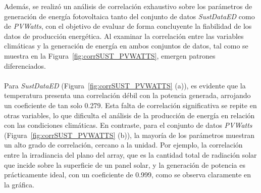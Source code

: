 Además, se realizó un análisis de correlación exhaustivo sobre los parámetros de generación de energía fotovoltaica tanto del conjunto de datos \textit{SustDataED} como de \textit{PVWatts}, con el objetivo de evaluar de forma concluyente la fiabilidad de los datos de producción energética. Al examinar la correlación entre las variables climáticas y la generación de energía en ambos conjuntos de datos, tal como se muestra en la Figura~\ref{fig:corrSUST_PVWATTS}, emergen patrones diferenciados.\\
\\
Para \textit{SustDataED} (Figura~\ref{fig:corrSUST_PVWATTS} (a)), es evidente que la temperatura presenta una correlación débil con la potencia generada, arrojando un coeficiente de tan solo 0.279. Esta falta de correlación significativa se repite en otras variables, lo que dificulta el análisis de la producción de energía en relación con las condiciones climáticas. En contraste, para el conjunto de datos \textit{PVWatts} (Figura~\ref{fig:corrSUST_PVWATTS} (b)), la mayoría de los parámetros muestran un alto grado de correlación, cercano a la unidad. Por ejemplo, la correlación entre la irradiancia del plano del array, que es la cantidad total de radiación solar que incide sobre la superficie de un panel solar, y la generación de potencia es prácticamente ideal, con un coeficiente de 0.999, como se observa claramente en la gráfica.


